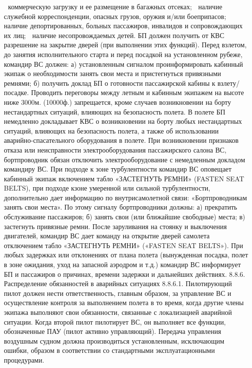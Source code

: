 	коммерческую загрузку и ее размещение в багажных отсеках;
	наличие служебной корреспонденции, опасных грузов, оружия и/или боеприпасов;
	наличие депортированных, больных пассажиров, инвалидов и сопровождающих их лиц;
	наличие несопровождаемых детей.
БП должен получить от КВС разрешение на закрытие дверей (при выполнении этих функций).
Перед взлетом, до занятия исполнительного старта и перед посадкой на установленном рубеже, командир ВС должен:
а)	установленным сигналом проинформировать кабинный экипаж о необходимости занять свои места и пристегнуться привязными ремнями;
б)	получить доклад БП о готовности пассажирской кабины к взлету/посадке.
Проводить переговоры между летным и кабинным экипажем на высоте ниже 3000м. (10000ф.) запрещается, кроме случаев возникновении на борту нестандартных ситуаций, влияющих на безопасность полета.
В полете БП немедленно докладывает КВС о возникновении на борту любых нестандартных ситуаций, влияющих на безопасность полета, а также об использовании аварийно-спасательного оборудования в полете.
При возникновении признаков отказа или неисправности электрооборудования пассажирского салона ВС, бортпроводник обязан отключить электрооборудование с немедленным докладом командиру ВС.
При подходе к зоне турбулентности командир ВС оповещает кабинный экипаж включением табло «ЗАСТЕГНУТЬ РЕМНИ» (FASTEN SEAT BELTS), при подходе кзоне умеренной или сильной турбулентности, дополнительно дает информацию по внутрисамолетной связи: «Бортпроводникам занять свои места».
По этому сигналу бортпроводники должны:
а)	прекратить обслуживание пассажиров;
б)	занять свои (или ближайшие свободные) места;
в)	застегнуть привязные ремни.
После заруливания на стоянку и выключения двигателей, командир ВС дает команду на открытие дверей самолета отключением табло «ЗАСТЕГНУТЬ РЕМНИ» («FASTEN SEAT BELTS»).
При любых задержках или отклонениях от плана полета (вынужденная посадка, полет в зоне ожидания, уход на запасной аэродром и т.д.) командир ВС информирует БП и пассажиров о причинах, времени задержки и дальнейших действиях.
8.8.6. Распределение обязанностей в аварийных ситуациях
8.8.6.1. Пилотирующий пилот должен нести ответственность, главным образом, за управление ВС и осуществление контроля за выполнением полета в то время, когда другие члены экипажа выполняют свои обязанности, связанные с локализацией аварийной ситуации. 
Когда второй пилот пилотирует ВС, он выполняет все функции, обозначенные ПАУ (пилот активно управляющий).
Передача управления воздушным судном должна производиться установленным, исключающим ошибки, образом в соответствии со стандартными эксплуатационными процедурами. 

